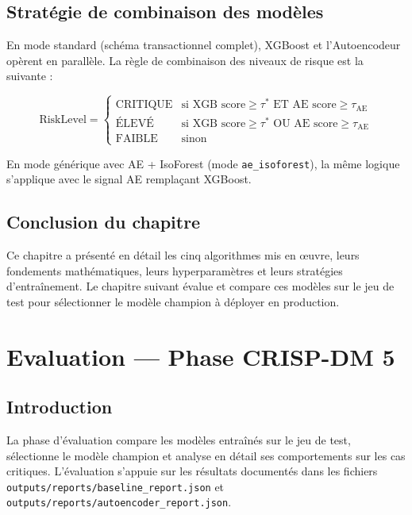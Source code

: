 \documentclass[12pt,a4paper,twoside]{report}
\theoremstyle{definition}
\begin{document}
\section{Stratégie de combinaison des modèles}

En mode standard (schéma transactionnel complet), XGBoost et l'Autoencodeur
opèrent en parallèle. La règle de combinaison des niveaux de risque est la suivante :

\begin{equation}
\text{RiskLevel} =
\begin{cases}
\text{CRITIQUE} & \text{si XGB score} \geq \tau^* \text{ ET AE score} \geq \tau_{\text{AE}} \\
\text{ÉLEVÉ}    & \text{si XGB score} \geq \tau^* \text{ OU AE score} \geq \tau_{\text{AE}} \\
\text{FAIBLE}   & \text{sinon}
\end{cases}
\label{eq:risk_combination}
\end{equation}

En mode générique avec AE + IsoForest (mode \texttt{ae\_isoforest}), la même
logique s'applique avec le signal AE remplaçant XGBoost.

\section{Conclusion du chapitre}

Ce chapitre a présenté en détail les cinq algorithmes mis en œuvre, leurs
fondements mathématiques, leurs hyperparamètres et leurs stratégies d'entraînement.
Le chapitre suivant évalue et compare ces modèles sur le jeu de test pour sélectionner
le modèle champion à déployer en production.

\chapter{Evaluation — Phase CRISP-DM 5}
\label{chap:evaluation}

\section{Introduction}

La phase d'évaluation compare les modèles entraînés sur le jeu de test, sélectionne
le modèle champion et analyse en détail ses comportements sur les cas critiques.
L'évaluation s'appuie sur les résultats documentés dans les fichiers
\texttt{outputs/reports/baseline\_report.json} et
\texttt{outputs/reports/autoencoder\_report.json}.
\end{document}
